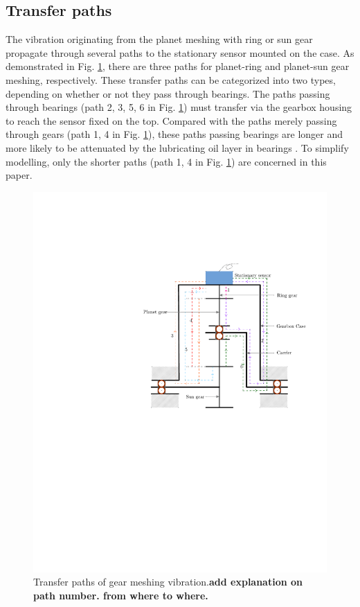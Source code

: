 \documentclass[a4paper,fleqn]{cas-sc}%
\begin{document}
\subsection{Transfer paths}
\par The vibration originating from the planet meshing with ring or sun gear propagate through several paths to the stationary sensor mounted on the case. As demonstrated in Fig. \ref{fig:transfer_path}, there are three paths for planet-ring and planet-sun gear meshing, respectively. These transfer paths can be categorized into two types, depending on whether or not they pass through bearings. The paths passing through bearings (path 2, 3, 5, 6 in Fig. \ref{fig:transfer_path}) must transfer via the gearbox housing to reach the sensor fixed on the top. Compared with the paths merely passing through gears (path 1, 4 in Fig. \ref{fig:transfer_path}), these paths passing bearings are longer and more likely to be attenuated by the lubricating oil layer in bearings \cite{Feng2012}. To simplify modelling, only the shorter paths (path 1, 4 in Fig. \ref{fig:transfer_path}) are concerned in this paper.
\begin{figure}[pos=htbp]
    \centering
    \includegraphics[scale=0.5]{transfer_path.pdf}
    \caption{Transfer paths of gear meshing vibration.\textbf{add explanation on path number. from where to where.}\label{fig:transfer_path}}
\end{figure}
\end{document}
